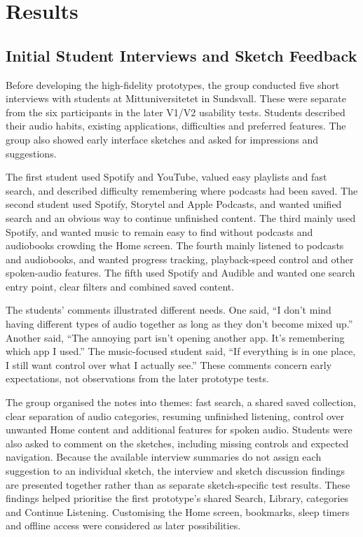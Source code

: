 \chapter{Results}
\label{chap:results}
\section{Initial Student Interviews and Sketch Feedback}
\label{sec:results-initial-interviews}

Before developing the high-fidelity prototypes, the group conducted five short interviews with students at Mittuniversitetet in Sundsvall. These were separate from the six participants in the later V1/V2 usability tests. Students described their audio habits, existing applications, difficulties and preferred features. The group also showed early interface sketches and asked for impressions and suggestions.

The first student used Spotify and YouTube, valued easy playlists and fast search, and described difficulty remembering where podcasts had been saved. The second student used Spotify, Storytel and Apple Podcasts, and wanted unified search and an obvious way to continue unfinished content. The third mainly used Spotify, and wanted music to remain easy to find without podcasts and audiobooks crowding the Home screen. The fourth mainly listened to podcasts and audiobooks, and wanted progress tracking, playback-speed control and other spoken-audio features. The fifth used Spotify and Audible and wanted one search entry point, clear filters and combined saved content.

The students' comments illustrated different needs. One said, ``I don't mind having different types of audio together as long as they don't become mixed up.'' Another said, ``The annoying part isn't opening another app. It's remembering which app I used.'' The music-focused student said, ``If everything is in one place, I still want control over what I actually see.'' These comments concern early expectations, not observations from the later prototype tests.

The group organised the notes into themes: fast search, a shared saved collection, clear separation of audio categories, resuming unfinished listening, control over unwanted Home content and additional features for spoken audio. Students were also asked to comment on the sketches, including missing controls and expected navigation. Because the available interview summaries do not assign each suggestion to an individual sketch, the interview and sketch discussion findings are presented together rather than as separate sketch-specific test results. These findings helped prioritise the first prototype's shared Search, Library, categories and Continue Listening. Customising the Home screen, bookmarks, sleep timers and offline access were considered as later possibilities.

